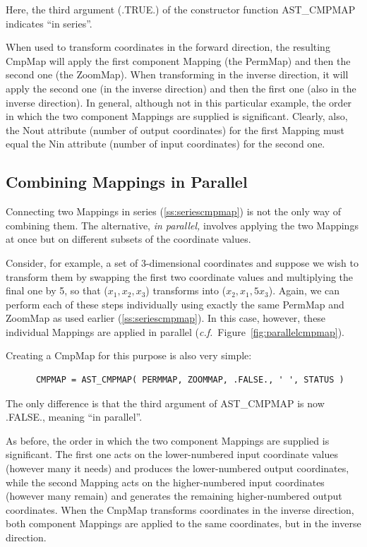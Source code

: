 \documentclass[twoside,11pt]{article}
\newcommand{\htmlref}[2]{#1}
\newcommand{\secref}[1]{\S\ref{#1}}
\renewcommand{\secref}[1]{\ref{#1}}
\begin{document}
Here, the third argument (.TRUE.) of the constructor function
\htmlref{AST\_CMPMAP}{AST_CMPMAP} indicates ``in series''.

When used to transform coordinates in the forward direction, the
resulting CmpMap will apply the first component \htmlref{Mapping}{Mapping} (the PermMap)
and then the second one (the ZoomMap). When transforming in the
inverse direction, it will apply the second one (in the inverse
direction) and then the first one (also in the inverse direction).  In
general, although not in this particular example, the order in which
the two component Mappings are supplied is significant. Clearly, also,
the \htmlref{Nout}{Nout} attribute (number of output coordinates) for the first
Mapping must equal the \htmlref{Nin}{Nin} attribute (number of input coordinates) for
the second one.

\subsection{Combining Mappings in Parallel}

Connecting two Mappings in series (\secref{ss:seriescmpmap}) is not the
only way of combining them. The alternative, {\em{in parallel,}}
involves applying the two Mappings at once but on different subsets of
the coordinate values.

Consider, for example, a set of 3-dimensional coordinates and suppose
we wish to transform them by swapping the first two coordinate values
and multiplying the final one by 5, so that ($x_1,x_2,x_3$) transforms
into ($x_2,x_1,5x_3$). Again, we can perform each of these steps
individually using exactly the same \htmlref{PermMap}{PermMap} and \htmlref{ZoomMap}{ZoomMap} as used
earlier (\secref{ss:seriescmpmap}). In this case, however, these
individual Mappings are applied in parallel
({\em{c.f.}}\ Figure~\ref{fig:parallelcmpmap}).

Creating a \htmlref{CmpMap}{CmpMap} for this purpose is also very simple:

\small
\begin{verbatim}
      CMPMAP = AST_CMPMAP( PERMMAP, ZOOMMAP, .FALSE., ' ', STATUS )
\end{verbatim}
\normalsize

The only difference is that the third argument of \htmlref{AST\_CMPMAP}{AST_CMPMAP} is now
.FALSE., meaning ``in parallel''.

As before, the order in which the two component Mappings are supplied
is significant. The first one acts on the lower-numbered input
coordinate values (however many it needs) and produces the
lower-numbered output coordinates, while the second \htmlref{Mapping}{Mapping} acts on
the higher-numbered input coordinates (however many remain) and
generates the remaining higher-numbered output coordinates.  When the
CmpMap transforms coordinates in the inverse direction, both component
Mappings are applied to the same coordinates, but in the inverse
direction.
\end{document}

